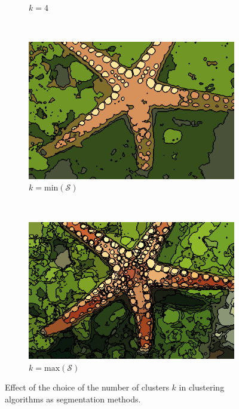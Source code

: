 \documentclass[journal]{IEEEtran}
\begin{document}
\begin{figure}[!t]
\begin{subfigure}[b]{0.18\textwidth}
        \caption{$k=4$}
    \end{subfigure} ~
    \begin{subfigure}[b]{0.18\textwidth}
    	\centering
    	\includegraphics[width=\textwidth]{12003_GaussianMixture_min_segm}
        \caption{$k=\mathrm{min}(\mathcal{S})$}
    \end{subfigure} ~
    \begin{subfigure}[b]{0.18\textwidth}
    	\centering
    	\includegraphics[width=\textwidth]{12003_GaussianMixture_max_segm}
        \caption{$k=\mathrm{max}(\mathcal{S})$}
    \end{subfigure} 
        	    
    \caption{Effect of the choice of the number of clusters $k$ in clustering algorithms as segmentation methods.}\label{fig:Gmixture_starfish_segms_diff_k}    
\end{figure}
\end{document}
